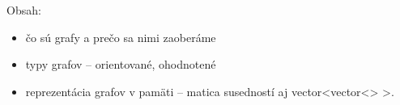 




Obsah:
\begin{itemize}
    \item čo sú grafy a prečo sa nimi zaoberáme
    \item typy grafov -- orientované, ohodnotené
    \item reprezentácia grafov v pamäti -- matica susedností aj vector<vector<> >.
\end{itemize}


